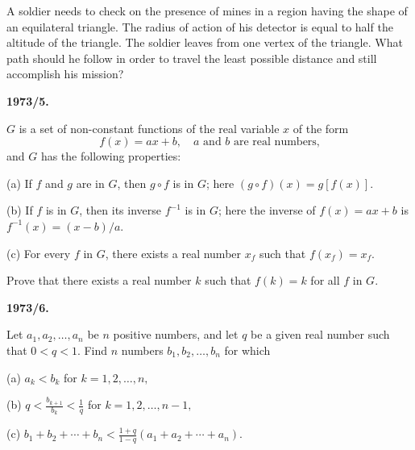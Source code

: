 \documentclass[12pt,a4paper]{article}
\begin{document}
A soldier needs to check on the presence of mines in a region having the shape of an equilateral triangle. The radius of action of his detector is equal to half the altitude of the triangle. The soldier leaves from one vertex of the triangle. What path should he follow in order to travel the least possible distance and still accomplish his mission?

\vspace{0.3cm}

\textbf{1973/5.}

$G$ is a set of non-constant functions of the real variable $x$ of the form
\[
f(x) = ax + b, \quad a \text{ and } b \text{ are real numbers,}
\]
and $G$ has the following properties:

(a) If $f$ and $g$ are in $G$, then $g \circ f$ is in $G$; here $(g \circ f)(x) = g[f(x)]$.

(b) If $f$ is in $G$, then its inverse $f^{-1}$ is in $G$; here the inverse of $f(x) = ax + b$ is $f^{-1}(x) = (x - b)/a$.

(c) For every $f$ in $G$, there exists a real number $x_f$ such that $f(x_f) = x_f$.

Prove that there exists a real number $k$ such that $f(k) = k$ for all $f$ in $G$.

\vspace{0.5cm}

\textbf{1973/6.}

Let $a_1, a_2, \ldots, a_n$ be $n$ positive numbers, and let $q$ be a given real number such that $0 < q < 1$. Find $n$ numbers $b_1, b_2, \ldots, b_n$ for which

(a) $a_k < b_k$ for $k = 1, 2, \ldots, n,$

(b) $q < \frac{b_{k+1}}{b_k} < \frac{1}{q}$ for $k = 1, 2, \ldots, n - 1,$

(c) $b_1 + b_2 + \cdots + b_n < \frac{1+q}{1-q}(a_1 + a_2 + \cdots + a_n).$
\end{document}
